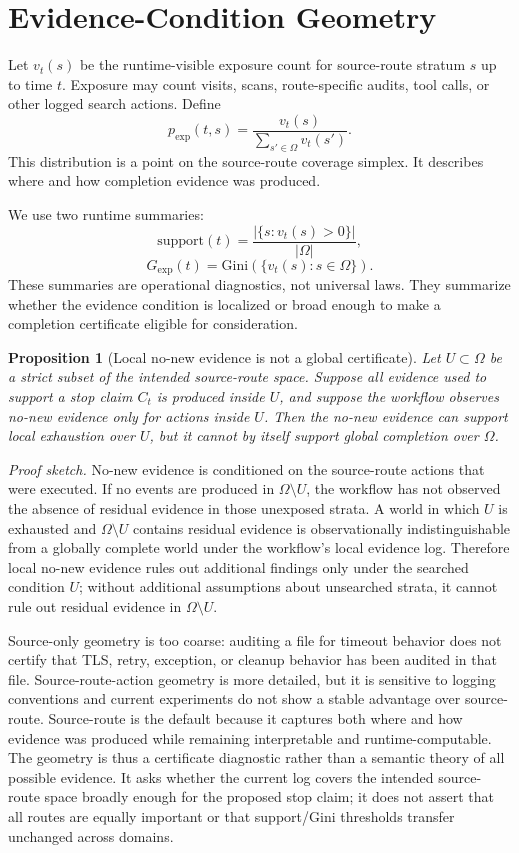 \documentclass[letterpaper,10pt,twocolumn]{article}
\newcommand{\pexp}{p_{\mathrm{exp}}}
\newcommand{\gexp}{G_{\mathrm{exp}}}
\newcommand{\supp}{\mathrm{support}}
\newcommand{\OmegaSR}{\Omega}
\newtheorem{proposition}{Proposition}
\begin{document}
\section{Evidence-Condition Geometry}

Let \(v_t(s)\) be the runtime-visible exposure count for source-route stratum
\(s\) up to time \(t\). Exposure may count visits, scans, route-specific audits,
tool calls, or other logged search actions. Define
\[
\pexp(t,s)=\frac{v_t(s)}{\sum_{s'\in\OmegaSR} v_t(s')}.
\]
This distribution is a point on the source-route coverage simplex. It describes
where and how completion evidence was produced.

We use two runtime summaries:
\[
\supp(t)=\frac{|\{s:v_t(s)>0\}|}{|\OmegaSR|},
\]
\[
\gexp(t)=\mathrm{Gini}(\{v_t(s):s\in\OmegaSR\}).
\]
These summaries are operational diagnostics, not universal laws. They summarize
whether the evidence condition is localized or broad enough to make a completion
certificate eligible for consideration.

\begin{proposition}[Local no-new evidence is not a global certificate]
Let \(U\subset \OmegaSR\) be a strict subset of the intended source-route space.
Suppose all evidence used to support a stop claim \(C_t\) is produced inside
\(U\), and suppose the workflow observes no-new evidence only for actions inside
\(U\). Then the no-new evidence can support local exhaustion over \(U\), but it
cannot by itself support global completion over \(\OmegaSR\).
\end{proposition}

\noindent\textit{Proof sketch.}
No-new evidence is conditioned on the source-route actions that were executed.
If no events are produced in \(\OmegaSR\setminus U\), the workflow has not
observed the absence of residual evidence in those unexposed strata. A world in
which \(U\) is exhausted and \(\OmegaSR\setminus U\) contains residual evidence
is observationally indistinguishable from a globally complete world under the
workflow's local evidence log. Therefore local no-new evidence rules out
additional findings only under the searched condition \(U\); without additional
assumptions about unsearched strata, it cannot rule out residual evidence in
\(\OmegaSR\setminus U\).

Source-only geometry is too coarse: auditing a file for timeout behavior does
not certify that TLS, retry, exception, or cleanup behavior has been audited in
that file. Source-route-action geometry is more detailed, but it is sensitive to
logging conventions and current experiments do not show a stable advantage over
source-route. Source-route is the default because it captures both where and how
evidence was produced while remaining interpretable and runtime-computable.
The geometry is thus a certificate diagnostic rather than a semantic theory of
all possible evidence. It asks whether the current log covers the intended
source-route space broadly enough for the proposed stop claim; it does not assert
that all routes are equally important or that support/Gini thresholds transfer
unchanged across domains.
\end{document}
